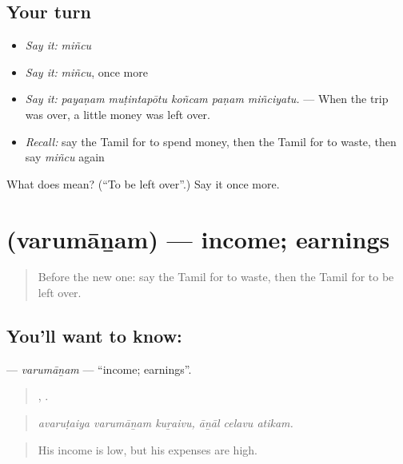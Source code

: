 \subsection*{Your turn}
\begin{itemize}
\raggedright
  \item \emph{Say it:} \emph{miñcu}
  \item \emph{Say it:} \emph{miñcu}, once more
  \item \emph{Say it:} \emph{payaṇam muṭintapōtu koñcam paṇam miñciyatu.} — When the trip was over, a little money was left over.
  \item \emph{Recall:} say the Tamil for to spend money, then the Tamil for to waste, then say \emph{miñcu} again
\end{itemize}

\begin{tcolorbox}[breakable,colback=teal!4,colframe=teal!35!black,title={Before you move on}]
What does  mean? (\textquotedblleft{}To be left over\textquotedblright{}.) Say it once more.
\end{tcolorbox}
\section[\texorpdfstring{\ta{வருமானம்} (varumāṉam)}{வருமானம் (varumāṉam)}]{ (varumāṉam) — income; earnings}

\label{lesson:TA-C448-varumanam}



\begin{quote}
Before the new one: say the Tamil for to waste, then the Tamil for to be left over.
\end{quote}

\subsection*{You'll want to know: }
\textbf{} — \emph{varumāṉam} — \textquotedblleft{}income; earnings\textquotedblright{}.

\begin{quote}
  ,   .
\end{quote}

\begin{quote}
\emph{avaruṭaiya varumāṉam kuṟaivu, āṉāl celavu atikam.}
\end{quote}

\begin{quote}
His income is low, but his expenses are high.
\end{quote}

